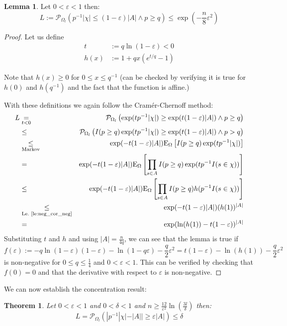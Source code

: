 \documentclass{article}
\newcommand{\prob}{\mathcal P}
\newcommand{\expectation}{\mathrm{E}}
\newcommand{\eps}{\varepsilon}
\newtheorem{theorem}{Theorem}
\theoremstyle{definition}
\newtheorem{lemma}{Lemma}
\begin{document}
\begin{lemma}\label{le:lower_tail}
Let $0 < \eps < 1$ then:
\[
  L := \prob_{\Omega_l} ( p^{-1} |\chi| \leq (1-\eps)|A| \wedge p \geq q) \leq \exp\left(-\frac{n}{8} \eps^2\right)
\]
\end{lemma}
\begin{proof}
Let us define
\begin{align*}
  t & := q \ln(1-\eps) < 0 \\
  h(x) & := 1+q x (e^{t/q}-1)  
\end{align*}

Note that $h(x) \geq 0$ for $0 \leq x \leq q^{-1}$ (can be checked by verifying it is true for $h(0)$ and $h(q^{-1})$ and the fact that the function is affine.)

With these definitions we again follow the Cram\'{e}r-Chernoff method:
{\allowdisplaybreaks
\begin{eqnarray*}
  L & \underset{t<0}{=} & \prob_{\Omega_l} \left( \exp(t p^{-1} |\chi|) \geq \exp(t (1-\eps)|A|) \wedge p \geq q \right) \\
    & \leq & \prob_{\Omega_l} \left( I(p \geq q) \exp(t p^{-1} |\chi|) \geq \exp(t (1-\eps)|A|) \wedge p > q \right) \\
    & \underset{\textrm{Markov}}{\leq} & \exp( -t (1-\eps) |A| ) \expectation_\Omega \left[ I(p \geq q) \exp ( t p^{-1} |\chi| ) \right] \\
    & = & \exp( -t (1-\eps) |A| ) \expectation_\Omega \left[ \prod_{s \in A} I(p \geq q) \exp ( t p^{-1} I(s \in \chi) ) \right] \\
    & \leq & \exp( -t (1-\eps) |A| ) \expectation_\Omega \left[ \prod_{s \in A} I(p \geq q) h( p^{-1} I(s \in \chi) ) \right] \\
    & \underset{\textrm{Le.~\ref{le:neg_cor_neg}}}{\leq} & \exp( -t (1-\eps) |A| ) (h(1))^{|A|} \\
    & = & \exp( \ln(h(1)) -t (1-\eps) )^{|A|}
\end{eqnarray*}
}
Substituting $t$ and $h$ and using $|A| = \frac{n}{4q}$, we can see that the lemma is true if
\[
  f(\eps) := -q \ln(1-\eps) (1-\eps) -\ln(1 - q \eps) - \frac{q}{2}\eps^2 = t (1-\eps) - \ln(h(1)) - \frac{q}{2} \eps^2
\]
is non-negative for $0 \leq q \leq \frac{1}{4}$ and $0 < \eps < 1$.
This can be verified by checking that $f(0) = 0$ and that the derivative with respect to $\eps$ is non-negative.
\end{proof}
We can now establish the concentration result:
\begin{theorem}
Let $0 < \eps < 1$ and $0 < \delta < 1$ and $n \geq \frac{12}{\eps^2} \ln\left(\frac{3l}{\delta}\right)$ then:
\[
  L = \prob_{\Omega_l} \left( | p^{-1} |\chi| - |A| | \geq \eps |A| \right) \leq \delta
\]
\end{theorem}
\end{document}
